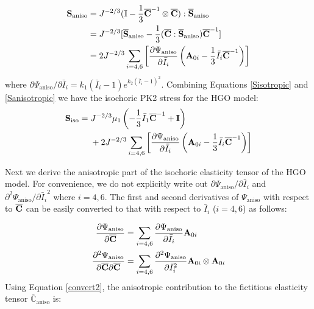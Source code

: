\begin{equation} \label{Sanisotropic}
\begin{split}
\bold{S}_\mathrm{aniso}
&= J^{-2/3}(\mathbb{I} - \frac{1}{3}{\overline{\bold{C}}}^{-1} \otimes \overline{\bold{C}}) : \overline{\bold{S}}_\mathrm{aniso} \\
&= J^{-2/3}[\overline{\bold{S}}_\mathrm{aniso} - \frac{1}{3}(\overline{\bold{C}} : \overline{\bold{S}}_\mathrm{aniso}){\overline{\bold{C}}}^{-1}] \\
&= 2J^{-2/3} \sum_{i = 4, 6}\left[\frac{\partial{\Psi_\mathrm{aniso}}}{\partial{\bar{I}_i}}  \left(\bold{A}_{0i} - \frac{1}{3}\bar{I}_i\overline{\bold{C}}^{-1}\right)\right]
\end{split}
\end{equation}
where
${\partial\Psi_\mathrm{aniso}}/{\partial{\bar{I}_i}} = k_1(\bar{I}_i - 1)e^{k_2(\bar{I}_i - 1)^2}$.
Combining Equations \ref{Sisotropic} and \ref{Sanisotropic} we have the isochoric PK2 stress for the HGO model:
\begin{equation} \label{HGOSiso}
\begin{split}
\bold{S}_\mathrm{iso} 
= {} &
J^{-2/3}\mu_1 \left( -\frac{1}{3}\bar{I}_1\overline{\bold{C}}^{-1} + \bold{I} \right) \\
&+2J^{-2/3} \sum_{i = 4, 6} \left[ \frac{\partial{\Psi_\mathrm{aniso}}}{\partial{\bar{I}_i}}  \left(\bold{A}_{0i} - \frac{1}{3}\bar{I}_i\overline{\bold{C}}^{-1} \right) \right]
\end{split}
\end{equation}

Next we derive the anisotropic part of the isochoric elasticity tensor of the HGO model. For convenience, we do not explicitly write out ${\partial\Psi_\mathrm{aniso}}/{\partial{\bar{I}_i}}$ and $\partial^2{\Psi_\mathrm{aniso}}/\partial{\bar{I}_i}^2$ where $i = 4, 6$. The first and second derivatives of $\Psi_\mathrm{aniso}$ with respect to $\overline{\bold{C}}$ can be easily converted to that with respect to $\bar{I}_{i}$ ($i = 4, 6$) as follows:

\begin{subequations} \label{convert}
\begin{align}
\frac{\partial\Psi_\mathrm{aniso}}{\partial\overline{\bold{C}}} 
&= \sum_{i = 4, 6}\frac{\partial\Psi_\mathrm{aniso}}{\partial\bar{I}_i}\bold{A}_{0i} \label{convert1} \\
\frac{\partial^2\Psi_\mathrm{aniso}}{\partial{\overline{\bold{C}}}\partial{\overline{\bold{C}}}} 
&= \sum_{i = 4, 6}\frac{\partial^2\Psi_\mathrm{aniso}}{\partial{\bar{I}_i}^2}\bold{A}_{0i} \otimes \bold{A}_{0i} \label{convert2}
\end{align}
\end{subequations}
Using Equation \ref{convert2}, the anisotropic contribution to the fictitious elasticity tensor $\overline{\mathbb{C}}_\mathrm{aniso}$ is:


